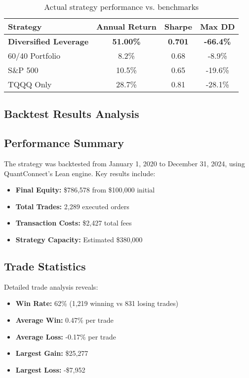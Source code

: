 \documentclass[11pt]{IEEEtran}
\begin{document}
\begin{table}[h]
\centering
\small
\begin{tabular}{lccc}
\toprule
Strategy & Annual Return & Sharpe & Max DD \\
\midrule
\textbf{Diversified Leverage} & \textbf{51.00\%} & \textbf{0.701} & \textbf{-66.4\%} \\
60/40 Portfolio & 8.2\% & 0.68 & -8.9\% \\
S\&P 500 & 10.5\% & 0.65 & -19.6\% \\
TQQQ Only & 28.7\% & 0.81 & -28.1\% \\
\bottomrule
\end{tabular}
\caption{Actual strategy performance vs. benchmarks}
\label{tab:performance}
\end{table}

\begin{multicols}{2}

\section{Backtest Results Analysis}

\subsection{Performance Summary}

The strategy was backtested from January 1, 2020 to December 31, 2024, using QuantConnect's Lean engine. Key results include:

\begin{itemize}
    \item \textbf{Final Equity:} \$786,578 from \$100,000 initial
    \item \textbf{Total Trades:} 2,289 executed orders
    \item \textbf{Transaction Costs:} \$2,427 total fees
    \item \textbf{Strategy Capacity:} Estimated \$380,000
\end{itemize}

\subsection{Trade Statistics}

Detailed trade analysis reveals:
\begin{itemize}
    \item \textbf{Win Rate:} 62\% (1,219 winning vs 831 losing trades)
    \item \textbf{Average Win:} 0.47\% per trade
    \item \textbf{Average Loss:} -0.17\% per trade
    \item \textbf{Largest Gain:} \$25,277
    \item \textbf{Largest Loss:} -\$7,952
\end{itemize}


\end{multicols}
\end{document}
